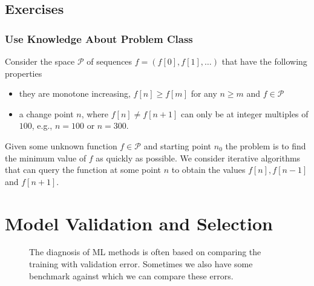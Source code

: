 \documentclass[12pt]{report}
\begin{document}
\section{Exercises}

\subsection{Use Knowledge About Problem Class} 
Consider the space $\mathcal{P}$ of sequences $f = (f[0],f[1],\ldots)$ 
that have the following properties 
\begin{itemize} 
	\item they are monotone increasing, $f[n] \geq f[m]$ for any $n \geq m$ and $f \in \mathcal{P}$
	\item a change point $n$, where $f[n] \neq f[n+1]$ can only be at integer multiples of $100$, 
	e.g., $n=100$ or $n=300$. 
\end{itemize} 
Given some unknown function $f \in \mathcal{P}$ and starting 
point $n_{0}$ the problem is to find the minimum value of $f$ as 
quickly as possible. We consider iterative algorithms that can query
the function at some point $n$ to obtain the values $f[n], f[n-1]$ and $f[n+1]$. 


\newpage
\chapter{Model Validation and Selection} 
\label{ch_validation_selection}

\begin{figure}[htbp]
\begin{center}
\end{center}
\label{fig_bars_val_sel}
\caption{The diagnosis of ML methods is often based on comparing the training 
	with validation error. Sometimes we also have some benchmark against which 
	we can compare these errors.}
\end{figure}
\end{document}
